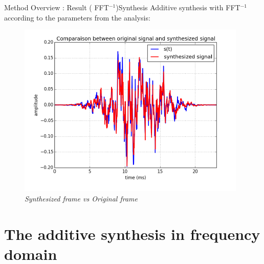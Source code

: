 \documentclass{bredelebeamer}
\begin{document}
\begin{frame}{Method Overview : Result ( FFT$^{-1}$)}{Synthesis}
Additive synthesis with FFT$^{-1}$ according to the parameters from the analysis:
\begin{figure}
	\centerline
	{\includegraphics[scale=0.5]{synthesisstep.png}}
	\caption{\it Synthesized frame vs Original frame}
\end{figure}
\end{frame}


\section{The additive synthesis in frequency domain}
\end{document}
